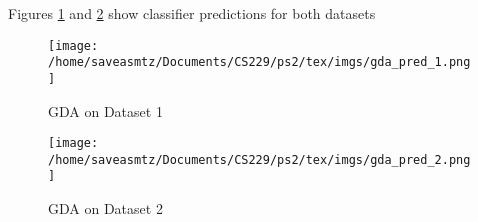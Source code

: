 \begin{answer}
Figures \ref{fig:GDA_pred_1} and \ref{fig:GDA_pred_2} show classifier predictions for both datasets

\begin{figure}
    \centering
    \texttt{[image: /home/saveasmtz/Documents/CS229/ps2/tex/imgs/gda\_pred\_1.png]}
    \caption{GDA on Dataset 1}
    \label{fig:GDA_pred_1}
\end{figure}

\begin{figure}
    \centering
    \texttt{[image: /home/saveasmtz/Documents/CS229/ps2/tex/imgs/gda\_pred\_2.png]}
    \caption{GDA on Dataset 2}
    \label{fig:GDA_pred_2}
\end{figure}


\end{answer}
